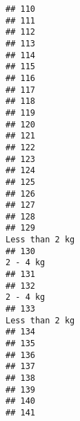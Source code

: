 \documentclass[
]{article}
\begin{document}
\begin{verbatim}
## 110                                                                            
## 111                                                                            
## 112                                                                            
## 113                                                                            
## 114                                                                            
## 115                                                                            
## 116                                                                            
## 117                                                                            
## 118                                                                            
## 119                                                                            
## 120                                                                            
## 121                                                                            
## 122                                                                            
## 123                                                                            
## 124                                                                            
## 125                                                                            
## 126                                                                            
## 127                                                                            
## 128                                                                            
## 129                                                              Less than 2 kg
## 130                                                                    2 - 4 kg
## 131                                                                            
## 132                                                                    2 - 4 kg
## 133                                                              Less than 2 kg
## 134                                                                            
## 135                                                                            
## 136                                                                            
## 137                                                                            
## 138                                                                            
## 139                                                                            
## 140                                                                            
## 141                                                                            

\end{verbatim}
\end{document}
